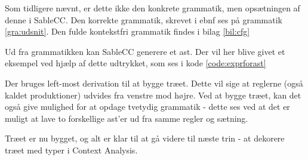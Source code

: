 \noindent Som tidligere nævnt, er dette ikke den konkrete grammatik, men opsætningen af denne i SableCC. Den korrekte grammatik, skrevet i \gls{ebnf} ses på grammatik \ref{gra:udsnit}. Den fulde kontekstfri grammatik findes i bilag \ref{bil:cfg}



\noindent Ud fra grammatikken kan SableCC generere et \gls{ast}. Der vil her blive givet et eksempel ved hjælp af dette udtrykket, som ses i kode \ref{code:exprforast}


\noindent Der bruges left-most derivation til at bygge træet. Dette vil sige at reglerne (også kaldet produktioner) udvides fra venstre mod højre. Ved at bygge træet, kan det også give mulighed for at opdage tvetydig grammatik - dette ses ved at det er muligt at lave to forskellige \gls{ast}'er ud fra samme regler og sætning.


\noindent Træet er nu bygget, og alt er klar til at gå videre til næste trin - at dekorere træet med typer i Context Analysis.